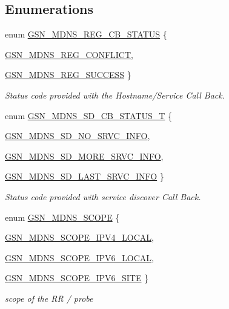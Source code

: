\subsection*{Enumerations}
\begin{DoxyCompactItemize}
\item 
enum \hyperlink{a00668_ga4736a957266d4e3ba37c9d5ec86beec8}{GSN\_\-MDNS\_\-REG\_\-CB\_\-STATUS} \{ \par
\hyperlink{a00668_gga4736a957266d4e3ba37c9d5ec86beec8ae3550fd7b1f603639481cabb668a64a7}{GSN\_\-MDNS\_\-REG\_\-CONFLICT}, 
\par
\hyperlink{a00668_gga4736a957266d4e3ba37c9d5ec86beec8a522d97bab05dc2d11054ab2e8403639b}{GSN\_\-MDNS\_\-REG\_\-SUCCESS}
 \}
\begin{DoxyCompactList}\small\item\em Status code provided with the Hostname/Service Call Back. \end{DoxyCompactList}\item 
enum \hyperlink{a00668_gaf68e291caa4e1bdf31169e000c41750b}{GSN\_\-MDNS\_\-SD\_\-CB\_\-STATUS\_\-T} \{ \par
\hyperlink{a00668_ggaf68e291caa4e1bdf31169e000c41750ba84a90f5cecb68159bb169fe99804e810}{GSN\_\-MDNS\_\-SD\_\-NO\_\-SRVC\_\-INFO}, 
\par
\hyperlink{a00668_ggaf68e291caa4e1bdf31169e000c41750bad2c9bab4f8fc05c87a9d9c289cacbf0e}{GSN\_\-MDNS\_\-SD\_\-MORE\_\-SRVC\_\-INFO}, 
\par
\hyperlink{a00668_ggaf68e291caa4e1bdf31169e000c41750ba46681d7db333ef079e1d35f82ef33d53}{GSN\_\-MDNS\_\-SD\_\-LAST\_\-SRVC\_\-INFO}
 \}
\begin{DoxyCompactList}\small\item\em Status code provided with service discover Call Back. \end{DoxyCompactList}\item 
enum \hyperlink{a00668_gabcc090f962c26d23957861a30b6bf166}{GSN\_\-MDNS\_\-SCOPE} \{ \par
\hyperlink{a00668_ggabcc090f962c26d23957861a30b6bf166a211fb8d41e3a558b3db60c797e4e5e62}{GSN\_\-MDNS\_\-SCOPE\_\-IPV4\_\-LOCAL}, 
\par
\hyperlink{a00668_ggabcc090f962c26d23957861a30b6bf166ac399ad8c02ad33aafa7677162b7e9540}{GSN\_\-MDNS\_\-SCOPE\_\-IPV6\_\-LOCAL}, 
\par
\hyperlink{a00668_ggabcc090f962c26d23957861a30b6bf166aaf172be006787a87aedd0d8e74c93790}{GSN\_\-MDNS\_\-SCOPE\_\-IPV6\_\-SITE}
 \}
\begin{DoxyCompactList}\small\item\em scope of the RR / probe \end{DoxyCompactList}\end{DoxyCompactItemize}
